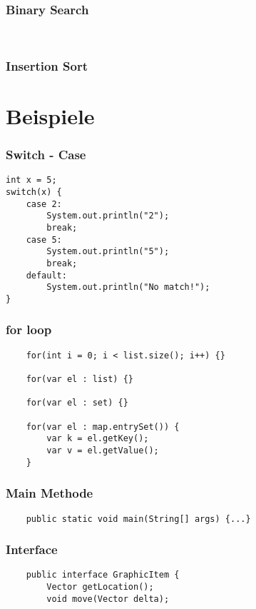 \begin{multicols*}{5}
		\subsubsection{Binary Search}
		
			\begin{lstlisting}
				
			\end{lstlisting}
		
		\subsubsection{Insertion Sort}
		
		

\section{Beispiele}

	\subsubsection{Switch - Case}
	\begin{lstlisting}
int x = 5; 
switch(x) {
	case 2: 
		System.out.println("2"); 
		break;
	case 5: 
		System.out.println("5"); 
		break;
	default: 
		System.out.println("No match!"); 
}
	\end{lstlisting}

	\subsubsection{for loop}
	\begin{lstlisting}
	for(int i = 0; i < list.size(); i++) {}
	
	for(var el : list) {}
	
	for(var el : set) {}
	
	for(var el : map.entrySet()) {
		var k = el.getKey();
		var v = el.getValue();
	}
	\end{lstlisting}

	\subsubsection{Main Methode}
	\begin{lstlisting}
	public static void main(String[] args) {...}	
	\end{lstlisting}

	\subsubsection{Interface}
	\begin{lstlisting}
	public interface GraphicItem {
		Vector getLocation();
		void move(Vector delta);
		

\end{lstlisting}
\end{multicols*}
